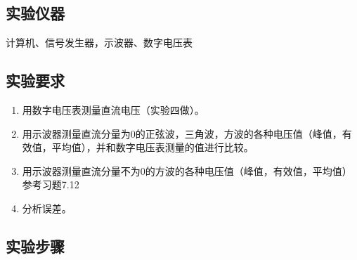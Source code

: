 \documentclass[12pt]{article}
\begin{document}
\subsection{实验仪器}
计算机、信号发生器，示波器、数字电压表
\subsection{实验要求}
\begin{enumerate}
  \item 用数字电压表测量直流电压（实验四做）。
\item 用示波器测量直流分量为0的正弦波，三角波，方波的各种电压值（峰值，有效值，平均值），并和数字电压表测量的值进行比较。
\item 用示波器测量直流分量不为0的方波的各种电压值（峰值，有效值，平均值）参考习题7.12
\item 分析误差。
\end{enumerate}
\subsection{实验步骤}
\end{document}

